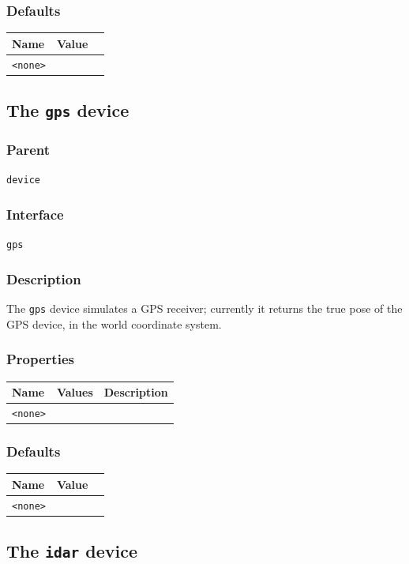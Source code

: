 \documentclass[11pt,twoside]{report}
\begin{document}
\subsubsection*{Defaults}
\begin{tabularx}{\columnwidth}{llX}
\hline
Name & Value\\
\hline
\verb'<none>'\\
\hline
\end{tabularx}


\newpage
\subsection{The {\tt gps} device}

\subsubsection*{Parent}
{\tt device}

\subsubsection*{Interface}
{\tt gps}

\subsubsection*{Description}
The {\tt gps} device simulates a GPS receiver; currently it returns
the true pose of the GPS device, in the world coordinate system.

\subsubsection*{Properties}
\begin{tabularx}{\columnwidth}{llX}
\hline
Name & Values & Description \\
\hline
\verb'<none>'\\
\hline
\end{tabularx}

\subsubsection*{Defaults}
\begin{tabularx}{\columnwidth}{llX}
\hline
Name & Value\\
\hline
\verb'<none>'\\
\hline
\end{tabularx}

\newpage
\subsection{The {\tt idar} device}
\end{document}
